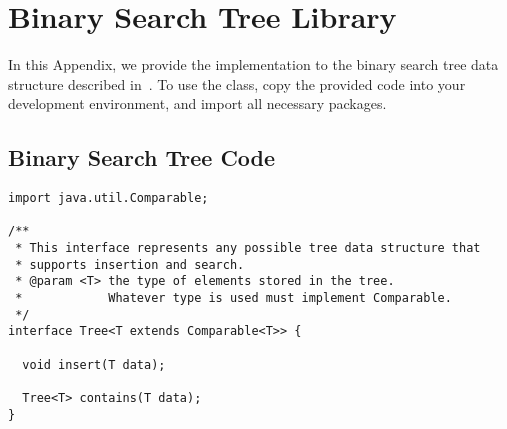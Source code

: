 \chapter{Binary Search Tree Library}
\label{appendix-bst-library} %

In this Appendix, we provide the implementation to the binary search tree data structure described in~.
To use the class, copy the provided code into your development environment, and import all necessary packages.

\section*{Binary Search Tree Code}

\begin{lstlisting}[language=MyJava]
import java.util.Comparable;

/**
 * This interface represents any possible tree data structure that 
 * supports insertion and search.
 * @param <T> the type of elements stored in the tree. 
 *            Whatever type is used must implement Comparable.
 */
interface Tree<T extends Comparable<T>> {

  void insert(T data);

  Tree<T> contains(T data);
}
\end{lstlisting}

